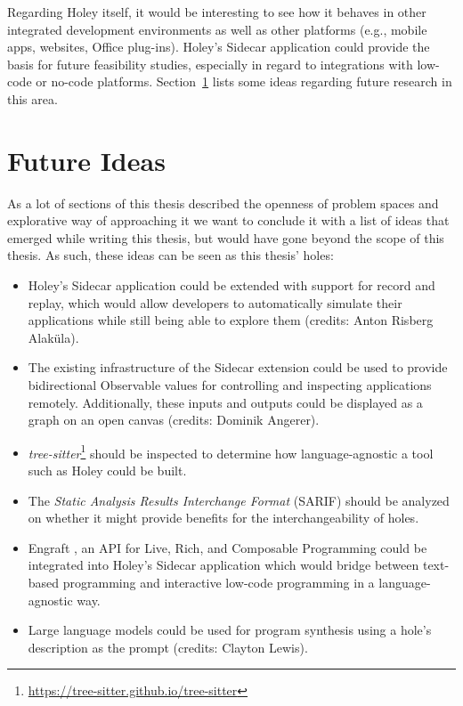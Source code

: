 Regarding Holey itself, it would be interesting to see how it behaves in other integrated development environments as well as other platforms (e.g., mobile apps, websites, Office plug-ins).
Holey's Sidecar application could provide the basis for future feasibility studies, especially in regard to integrations with low-code or no-code platforms.
Section~\ref{sec:discussion-future-ideas} lists some ideas regarding future research in this area.


\section{Future Ideas}
\label{sec:discussion-future-ideas}
As a lot of sections of this thesis described the openness of problem spaces and explorative way of approaching it we want to conclude it with a list of ideas that emerged while writing this thesis, but would have gone beyond the scope of this thesis.
As such, these ideas can be seen as this thesis' holes:
\begin{itemize}
    \item Holey's Sidecar application could be extended with support for record and replay, which would allow developers to automatically simulate their applications while still being able to explore them (credits: Anton Risberg Alaküla).
    \item The existing infrastructure of the Sidecar extension could be used to provide bidirectional Observable values for controlling and inspecting applications remotely. Additionally, these inputs and outputs could be displayed as a graph on an open canvas (credits: Dominik Angerer).
    \item \emph{tree-sitter}\footnote{\url{https://tree-sitter.github.io/tree-sitter}} should be inspected to determine how language-agnostic a tool such as Holey could be built.
    \item The \emph{Static Analysis Results Interchange Format} (SARIF) should be analyzed on whether it might provide benefits for the interchangeability of holes.
    \item Engraft \cite{horowitz_engraft_2023}, an API for Live, Rich, and Composable Programming could be integrated into Holey's Sidecar application which would bridge between text-based programming and interactive low-code programming in a language-agnostic way.
    \item Large language models could be used for program synthesis using a hole's description as the prompt (credits: Clayton Lewis).
\end{itemize}


